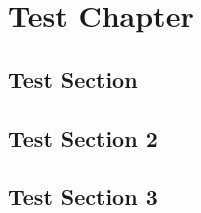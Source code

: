 \documentclass{scrbook}
\begin{document}
	
	\chapter{Test Chapter}
	\section{Test Section}    
	\lipsum[1-3]    
	\newpage    
	\section{Test Section 2}    
	\lipsum[1-3]    
	\newpage    
	\section{Test Section 3}   
	\lipsum[1-3]
	
\end{document}
